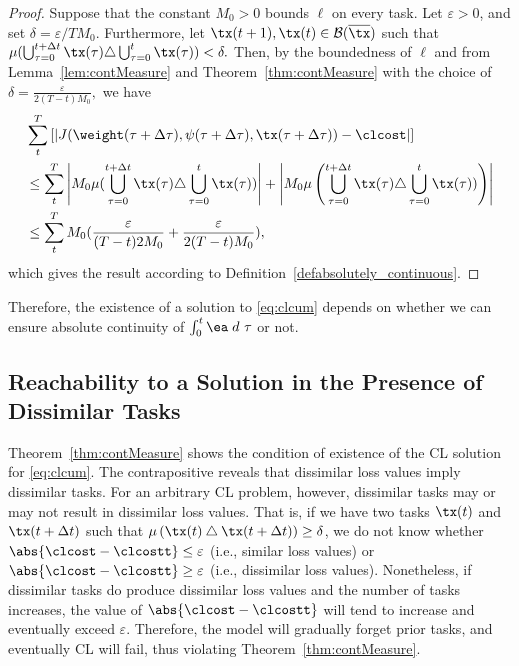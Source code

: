 \begin{proof}
    Suppose that the constant $M_0>0$ bounds $\ell$ on every task. 
    Let $\varepsilon>0$, and  set $\delta = \varepsilon/TM_0.$ 
    Furthermore, let $\tx(t+1),\tx(t) \in \mathcal{\mathcal{B}}(\overline{\tx})$ 
    such that $\mu(\bigcup_{\tau = 0}^{t+\Delta t} \tx(\tau)\triangle \bigcup_{\tau = 0}^{t} \tx(\tau))< \delta.$  Then, by the boundedness of $\ell$ and from Lemma~\ref{lem:contMeasure} and Theorem~\ref{thm:contMeasure} with the choice of $\delta = \frac{\varepsilon}{2(T-t) M_0},$ we have
    \begin{align*}
        & \sum_{t}^T \left[ \left\vert J(\weight(\tau+\Delta \tau),\psi(\tau+\Delta \tau),\tx(\tau+\Delta \tau)) - \clcost \right\vert \right] \\ 
        & \leq \sum_{t}^T \left\vert M_0 \mu(\bigcup_{\tau = 0}^{t+\Delta t} \tx(\tau)\triangle \bigcup_{\tau = 0}^{t} \tx(\tau)) \right\vert 
        + \left\vert M_0  \mu\left(\bigcup_{\tau = 0}^{t+\Delta t} \tx(\tau)\triangle \bigcup_{\tau = 0}^{t} \tx(\tau)) \right) \right\vert \\
        & \leq \sum_{t}^T M_0( \frac{\varepsilon}{ (T-t) 2M_0} + \frac{\varepsilon}{2(T-t) M_0} ),
    \end{align*}
    which gives the result according to Definition~\ref{defabsolutely_continuous}.
\end{proof}
Therefore, the existence of a solution to \eqref{eq:clcum} depends on whether we can ensure absolute continuity of $\int_0^t \ea \;  d~\tau$ or not. 

\subsection{Reachability to a Solution in the Presence of Dissimilar Tasks}
Theorem~\ref{thm:contMeasure} shows the condition of existence of the CL solution for \eqref{eq:clcum}. 
The contrapositive reveals that dissimilar loss values imply dissimilar tasks.  For an arbitrary CL problem, however,
dissimilar tasks may or may not result in dissimilar loss values. 
That is, if we have two tasks $\tx(t)$ and $\tx(t+\Delta t)$ 
such that $\mu \left( \tx(t)\bigtriangleup \tx(t+\Delta t) \right) \geq \delta$, 
 we do not know whether $\abs{\clcost-\clcostt} \leq \varepsilon$ 
(i.e., similar loss values) or $\abs{\clcost-\clcostt} \geq \varepsilon$ 
(i.e., dissimilar loss values).
Nonetheless, if dissimilar tasks do produce dissimilar loss values and the number of tasks increases, the value of $\abs{\clcost-\clcostt}$ will tend to increase  and eventually exceed $\varepsilon.$
Therefore, the model will gradually forget prior tasks, and eventually CL will fail, thus violating Theorem~\ref{thm:contMeasure}. 

